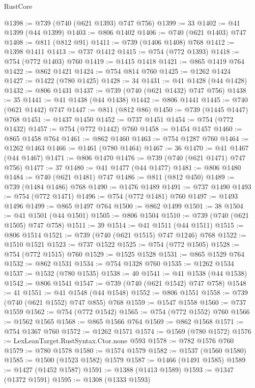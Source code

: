 \begin{lexlean}{RustCore}
\begin{coremodule}
@1398 := @739 (@740 (@621 @1393) @747 @756)
@1399 := 33
@1402 := @41 @1399 (@44 @1399)
@1403 := @806 @1402
@1406 := @740 (@621 @1403) @747
@1408 := @811 (@812 @91)
@1411 := @739 (@1406 @1408) @768
@1412 := @1398 @1411
@1413 := @737 @1412
@1415 := @754 (@772 @1393)
@1418 := @754 (@772 @1403) @760
@1419 := @1415 @1418
@1421 := @865 @1419 @764
@1422 := @862 @1421
@1424 := @754 @814 @760
@1425 := @1262 @1424
@1427 := @1422 (@780 @1425)
@1428 := 34
@1431 := @41 @1428 (@44 @1428)
@1432 := @806 @1431
@1437 := @739 (@740 (@621 @1432) @747 @756)
@1438 := 35
@1441 := @41 @1438 (@44 @1438)
@1442 := @806 @1441
@1445 := @740 (@621 @1442) @747
@1447 := @811 (@812 @86)
@1450 := @739 (@1445 @1447) @768
@1451 := @1437 @1450
@1452 := @737 @1451
@1454 := @754 (@772 @1432)
@1457 := @754 (@772 @1442) @760
@1458 := @1454 @1457
@1460 := @865 @1458 @764
@1461 := @862 @1460
@1463 := @754 @1287 @760
@1464 := @1262 @1463
@1466 := @1461 (@780 @1464)
@1467 := 36
@1470 := @41 @1467 (@44 @1467)
@1471 := @806 @1470
@1476 := @739 (@740 (@621 @1471) @747 @756)
@1477 := 37
@1480 := @41 @1477 (@44 @1477)
@1481 := @806 @1480
@1484 := @740 (@621 @1481) @747
@1486 := @811 (@812 @450)
@1489 := @739 (@1484 @1486) @768
@1490 := @1476 @1489
@1491 := @737 @1490
@1493 := @754 (@772 @1471)
@1496 := @754 (@772 @1481) @760
@1497 := @1493 @1496
@1499 := @865 @1497 @764
@1500 := @862 @1499
@1501 := 38
@1504 := @41 @1501 (@44 @1501)
@1505 := @806 @1504
@1510 := @739 (@740 (@621 @1505) @747 @758)
@1511 := 39
@1514 := @41 @1511 (@44 @1511)
@1515 := @806 @1514
@1521 := @739 (@740 (@621 @1515) @747 @1246) @768
@1522 := @1510 @1521
@1523 := @737 @1522
@1525 := @754 (@772 @1505)
@1528 := @754 (@772 @1515) @760
@1529 := @1525 @1528
@1531 := @865 @1529 @764
@1532 := @862 @1531
@1534 := @754 @1328 @760
@1535 := @1262 @1534
@1537 := @1532 (@780 @1535)
@1538 := 40
@1541 := @41 @1538 (@44 @1538)
@1542 := @806 @1541
@1547 := @739 (@740 (@621 @1542) @747 @758)
@1548 := 41
@1551 := @41 @1548 (@44 @1548)
@1552 := @806 @1551
@1558 := @739 (@740 (@621 @1552) @747 @855) @768
@1559 := @1547 @1558
@1560 := @737 @1559
@1562 := @754 (@772 @1542)
@1565 := @754 (@772 @1552) @760
@1566 := @1562 @1565
@1568 := @865 @1566 @764
@1569 := @862 @1568
@1571 := @754 @1367 @760
@1572 := @1262 @1571
@1574 := @1569 (@780 @1572)
@1576 := LexLeanTarget.RustSyntax.Ctor.none @593
@1578 := @782 @1576 @760
@1579 := @780 @1578
@1580 := @1574 @1579
@1582 := @1537 (@1560 @1580)
@1585 := @1500 (@1523 @1582) @1579
@1587 := @1466 (@1491 @1585)
@1589 := @1427 (@1452 @1587)
@1591 := @1388 (@1413 @1589)
@1593 := @1347 (@1372 @1591)
@1595 := @1308 (@1333 @1593)

\end{coremodule}
\end{lexlean}
